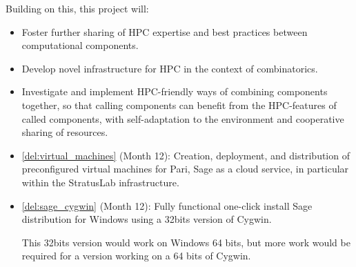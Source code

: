 \begin{Workpackage}{\thewpno}
\begin{WPDescription}
\begin{itemize}
    Building on this, this project will:
    \begin{itemize}
    \item Foster further sharing of HPC expertise and best practices
      between computational components.
    \item Develop novel infrastructure for HPC in the context of
      combinatorics.
    \item Investigate and implement HPC-friendly ways of combining
      components together, so that calling components can benefit from
      the HPC-features of called components, with self-adaptation to
      the environment and cooperative sharing of resources.
    \end{itemize}
  \end{itemize}
\end{WPDescription}

\begin{WPDeliverables}
\begin{itemize}
\item \ref{del:virtual_machines} (Month 12): Creation, deployment, and
  distribution of preconfigured virtual machines for Pari, Sage as a
  cloud service, in particular within the StratusLab infrastructure.
\item \ref{del:sage_cygwin} (Month 12): Fully functional one-click
  install Sage distribution for Windows using a 32bits version of Cygwin.

  This 32bits version would work on Windows 64 bits, but more work
  would be required for a version working on a 64 bits of Cygwin.


\end{itemize}
\end{WPDeliverables}
\end{Workpackage}
